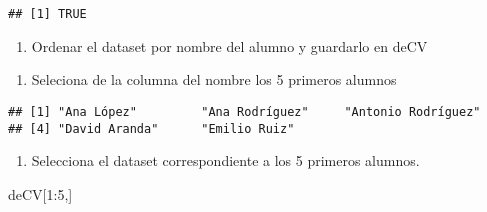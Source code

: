 \documentclass[
]{book}
\newenvironment{Shaded}{\begin{snugshade}}{\end{snugshade}}
\newcommand{\AttributeTok}[1]{\textcolor[rgb]{0.77,0.63,0.00}{#1}}
\newcommand{\DecValTok}[1]{\textcolor[rgb]{0.00,0.00,0.81}{#1}}
\newcommand{\FunctionTok}[1]{\textcolor[rgb]{0.00,0.00,0.00}{#1}}
\newcommand{\NormalTok}[1]{#1}
\newcommand{\OtherTok}[1]{\textcolor[rgb]{0.56,0.35,0.01}{#1}}
\newcommand{\SpecialCharTok}[1]{\textcolor[rgb]{0.00,0.00,0.00}{#1}}
\newcommand{\StringTok}[1]{\textcolor[rgb]{0.31,0.60,0.02}{#1}}
\providecommand{\tightlist}{%
  \setlength{\itemsep}{0pt}\setlength{\parskip}{0pt}}
\begin{document}
\begin{verbatim}
## [1] TRUE
\end{verbatim}

\begin{enumerate}
\def\labelenumi{\arabic{enumi}.}
\setcounter{enumi}{6}
\tightlist
\item
  Ordenar el dataset por nombre del alumno y guardarlo en deCV
\end{enumerate}

\begin{Shaded}
\end{Shaded}

\begin{enumerate}
\def\labelenumi{\arabic{enumi}.}
\setcounter{enumi}{7}
\tightlist
\item
  Seleciona de la columna del nombre los 5 primeros alumnos
\end{enumerate}

\begin{Shaded}
\end{Shaded}

\begin{verbatim}
## [1] "Ana López"         "Ana Rodríguez"     "Antonio Rodríguez"
## [4] "David Aranda"      "Emilio Ruiz"
\end{verbatim}

\begin{enumerate}
\def\labelenumi{\arabic{enumi}.}
\setcounter{enumi}{8}
\tightlist
\item
  Selecciona el dataset correspondiente a los 5 primeros alumnos.
\end{enumerate}

\begin{Shaded}
\begin{Highlighting}[]
\NormalTok{deCV[}\DecValTok{1}\SpecialCharTok{:}\DecValTok{5}\NormalTok{,]}
\end{Highlighting}
\end{Shaded}
\end{document}
